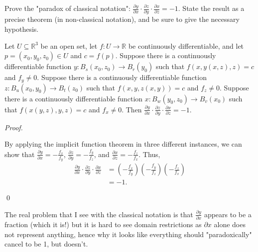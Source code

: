 \documentclass[12pt]{article}
\newenvironment{problem}[2][Problem]{\begin{trivlist}
\item[\hskip \labelsep {\bfseries #1}\hskip \labelsep {\bfseries
#2.}]}{\end{trivlist}}
\newenvironment{theorem}[2][Theorem]{\begin{trivlist}
\item[\hskip \labelsep {\bfseries #1}\hskip \labelsep {\bfseries #2.}]}{\end{trivlist}}
\newenvironment{sol}
    {\emph{Proof.}
    }
    {
    \qed
    }
\begin{document}
\begin{problem}{1}
\begin{itemize}
  \item[(c)] Prove the "paradox of classical notation": $\frac{\partial y}{\partial x} \cdot \frac{\partial z}{\partial y} \cdot \frac{\partial x}{\partial z} = -1$. State the result as a precise theorem (in non-classical notation), and be sure to give the necessary hypothesis.  
  
  \begin{theorem}{1}
    Let $U \subseteq \mathbb{R}^{3}$ be an open set, let $f : U \to \mathbb{R}$ be continuously differentiable, and let $p = (x_0, y_0, z_0) \in U$ and $c = f(p)$. Suppose there is a continuously differentiable function $y : B_s(x_0,z_0) \to B_r(y_0)$ such that $f(x,y(x,z),z) = c$ and $f_y \neq 0$. Suppose there is a continuously differentiable function $z : B_u(x_0,y_0) \to B_t(z_0)$ such that $f(x,y,z(x,y)) = c$ and $f_z \neq 0$. Suppose there is a continuously differentiable function $x : B_w(y_0,z_0) \to B_v(x_0)$ such that $f(x(y,z),y,z) = c$ and $f_x \neq 0$. Then $\frac{\partial y}{\partial x} \cdot \frac{\partial z}{\partial y} \cdot \frac{\partial x}{\partial z} = -1$.
  \end{theorem}

  \begin{sol}
    By applying the implicit function theorem in three different instances, we can show that $\frac{\partial y}{\partial x} = -\frac{f_x}{f_y}$, $\frac{\partial z}{\partial y} = -\frac{f_y}{f_z}$, and $\frac{\partial x}{\partial z} = -\frac{f_z}{f_x}$. Thus, \begin{align*}
      \frac{\partial y}{\partial x} \cdot \frac{\partial z}{\partial y} \cdot \frac{\partial x}{\partial z} &= \left( -\frac{f_x}{f_y} \right) \left( -\frac{f_y}{f_z} \right) \left( -\frac{f_z}{f_x} \right) \\ &= -1.
    \end{align*}
  \end{sol}

  \hspace{1 em} The real problem that I see with the classical notation is that $\frac{\partial y}{\partial x}$ appears to be a fraction (which it is!) but it is hard to see domain restrictions as $\partial x$ alone does not represent anything, hence why it looks like everything should "paradoxically" cancel to be 1, but doesn't.
\end{itemize}
\end{problem}
\end{document}

